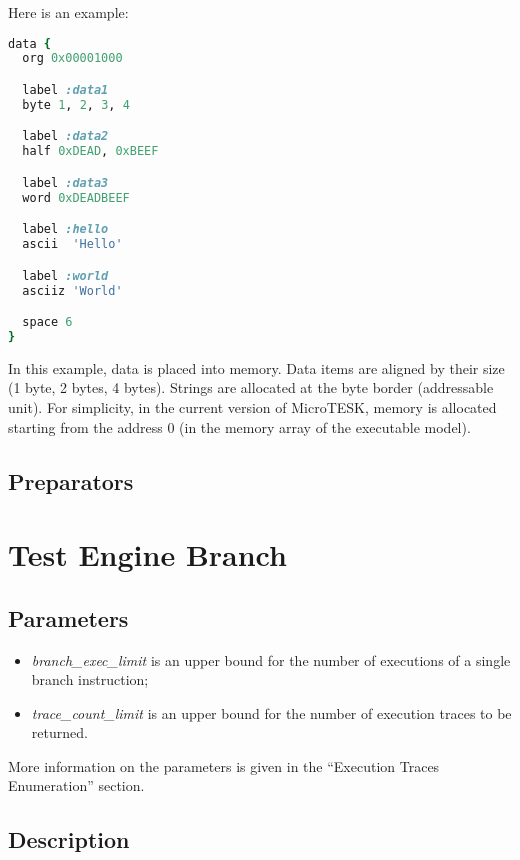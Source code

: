 \documentclass[oneside,final,12pt]{extreport}
\begin{document}
Here is an example:

\begin{lstlisting}[language=ruby]
data {
  org 0x00001000

  label :data1
  byte 1, 2, 3, 4

  label :data2
  half 0xDEAD, 0xBEEF

  label :data3
  word 0xDEADBEEF

  label :hello
  ascii  'Hello'

  label :world
  asciiz 'World'

  space 6
}
\end{lstlisting}

In this example, data is placed into memory. Data items are aligned by their size
(1 byte, 2 bytes, 4 bytes). Strings are allocated at the byte border (addressable
unit). For simplicity, in the current version of MicroTESK, memory is allocated
starting from the address 0 (in the memory array of the executable model).


\section{Preparators}


\chapter{Test Engine Branch}

\section{Parameters}

\begin{itemize}
\item \emph{branch{\_}exec{\_}limit} is an upper bound for the number of executions of a single branch instruction;
\item \emph{trace{\_}count{\_}limit} is an upper bound for the number of execution traces to be returned.
\end{itemize}

More information on the parameters is given in the “Execution Traces Enumeration” section.

\section{Description}
\end{document}
